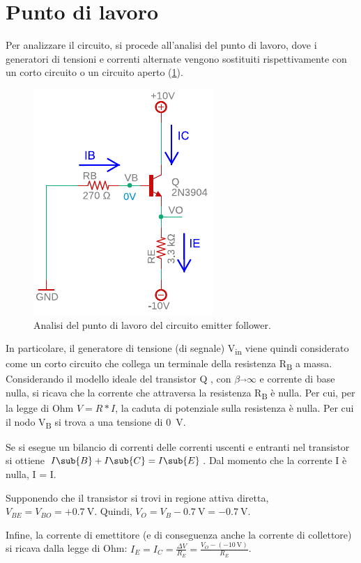 \section{Punto di lavoro}
Per analizzare il circuito, si procede all'analisi del punto di lavoro, dove i generatori di tensioni e correnti alternate vengono sostituiti rispettivamente con un corto circuito o un circuito aperto (\Fig\ref{fig:emitterfollwer_puntodilavoro}).
\begin{figure}[h!]
	\centering
	\includegraphics[width=0.4\linewidth]{./OtherFiles/Laboratorio 1/emitter follower_punto di lavoro_printout}
	\caption{Analisi del punto di lavoro del circuito emitter follower.}
	\label{fig:emitterfollwer_puntodilavoro}
\end{figure}
In particolare, il generatore di tensione (di segnale) V\textsubscript{in} viene quindi considerato come un corto circuito che collega un terminale della resistenza R\textsubscript{B} a massa. Considerando il modello ideale del transistor Q , con $\beta\overrightarrow{}\infty$ e corrente di base nulla, si ricava che la corrente che attraversa la resistenza R\textsubscript{B} è nulla. Per cui, per la legge di Ohm $V=R*I$, la caduta di potenziale sulla resistenza è nulla. Per cui il nodo V\textsubscript{B} si trova a una tensione di \SI{0}{\volt}. 

Se si esegue un bilancio di correnti delle correnti uscenti e entranti nel transistor si ottiene $I\sub{B}+I\sub{C}=I\sub{E}$. Dal momento che la corrente I è nulla, I = I.

Supponendo che il transistor si trovi in regione attiva diretta, $V_{BE}=V_{BO}=+\SI{0.7}{\volt}$. Quindi, $V_O=V_B-\SI{0.7}{\volt}= -\SI{0.7}{\volt}$.

Infine, la corrente di emettitore (e di conseguenza anche la corrente di collettore) si ricava dalla legge di Ohm: $I_E=I_C=\frac{\Delta V}{R_E}=\frac{V_O-(-\SI{10}{\volt})}{R_E}$. 

